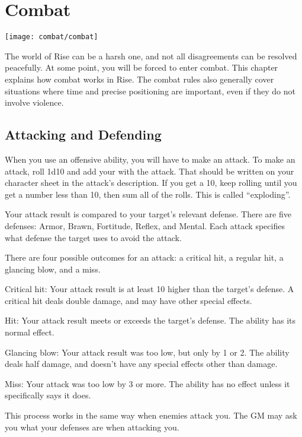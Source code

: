 \chapter{Combat}\label{Combat}
\texttt{[image: combat/combat]}

The world of Rise can be a harsh one, and not all disagreements can be resolved peacefully.
At some point, you will be forced to enter combat.
This chapter explains how combat works in Rise.
The combat rules also generally cover situations where time and precise positioning are important, even if they do not involve violence.

\section{Attacking and Defending}
  When you use an offensive ability, you will have to make an attack.
  To make an attack, roll 1d10 and add your  with the attack.
  That should be written on your character sheet in the attack's description.
  If you get a 10, keep rolling until you get a number less than 10, then sum all of the rolls.
  This is called ``exploding''.

  Your attack result is compared to your target's relevant defense.
  There are five defenses: Armor, Brawn, Fortitude, Reflex, and Mental.
  Each attack specifies what defense the target uses to avoid the attack.

  There are four possible outcomes for an attack: a critical hit, a regular hit, a glancing blow, and a miss.
  \begin{raggeditemize}
    \item Critical hit: Your attack result is at least 10 higher than the target's defense.
      A critical hit deals double damage, and may have other special effects.
    \item Hit: Your attack result meets or exceeds the target's defense.
      The ability has its normal effect.
    \item Glancing blow: Your attack result was too low, but only by 1 or 2.
      The ability deals half damage, and doesn't have any special effects other than damage.
    \item Miss: Your attack was too low by 3 or more.
      The ability has no effect unless it specifically says it does.
  \end{raggeditemize}

  This process works in the same way when enemies attack you.
  The GM may ask you what your defenses are when attacking you.

